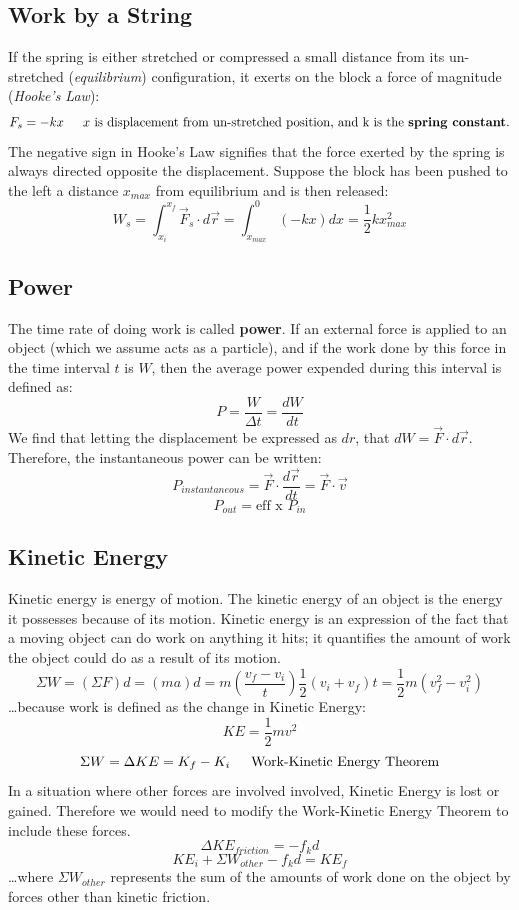 \documentclass{article}
\begin{document}
	\subsection{Work by a String}
    	If the spring is either stretched or compressed a small distance from its un-stretched (\textit{equilibrium}) configuration, it exerts on the block a force of magnitude (\textit{Hooke's Law}):
        \[
        	F_s=-kx \indent
            \text{$x$ is displacement from un-stretched position, and k is the \textbf{spring constant}.}
        \]
        The negative sign in Hooke's Law signifies that the force exerted by the spring is always directed opposite the displacement. Suppose the block has been pushed to the left a distance $x_{max}$ from equilibrium and is then released:
        \[
        	W_s=\int_{x_i}^{x_f} \vec{F}_s\cdot d\vec{r}=\int_{x_{max}}^0 (-kx)dx=\frac{1}{2} kx_{max}^2
        \]
        
	\subsection{Power}
    	The time rate of doing work is called \textbf{power}. If an external force is applied to an object (which we assume acts as a particle), and if the work done by this force in the time interval $t$ is $W$, then the average power expended during this interval is defined as:
		\[
        	P=\frac{W}{\Delta t}=\frac{dW}{dt}
        \]
        We find that letting the displacement be expressed as $dr$, that $dW=\vec{F}\cdot d\vec{r}$. Therefore, the instantaneous power can be written:
        \[
        	P_{instantaneous}=\vec{F}\cdot \frac{d\vec{r}}{dt}=\vec{F}\cdot \vec{v}
        \]
        \[
        	P_{out}=\text{eff x } P_{in}
        \]
        
	\subsection{Kinetic Energy}
    	Kinetic energy is energy of motion. The kinetic energy of an object is the energy it possesses because of its motion. Kinetic energy is an expression of the fact that a moving object can do work on anything it hits; it quantifies the amount of work the object could do as a result of its motion.
        \[
        	\Sigma W=(\Sigma F)d=(ma)d=m(\frac{v_f-v_i}{t})\frac{1}{2}(v_i+v_f)t=\frac{1}{2}m(v_f^2-v_i^2)
        \]
        \ldots because work is defined as the change in Kinetic Energy:
        \[
        	KE=\frac{1}{2}mv^2
        \]
        \[
        	\Sigma W=\Delta KE=K_f-K_i \indent
            \text{Work-Kinetic Energy Theorem}
        \]
        In a situation where other forces are involved involved, Kinetic Energy is lost or gained. Therefore we would need to modify the Work-Kinetic Energy Theorem to include these forces.
        \[
        	\Delta KE_{friction}=-f_kd
        \]
        \[
        	KE_i+\Sigma W_{other}-f_kd=KE_f
        \]
        \ldots where $\Sigma W_{other}$ represents the sum of the amounts of work done on the object by
forces other than kinetic friction.
\end{document}
